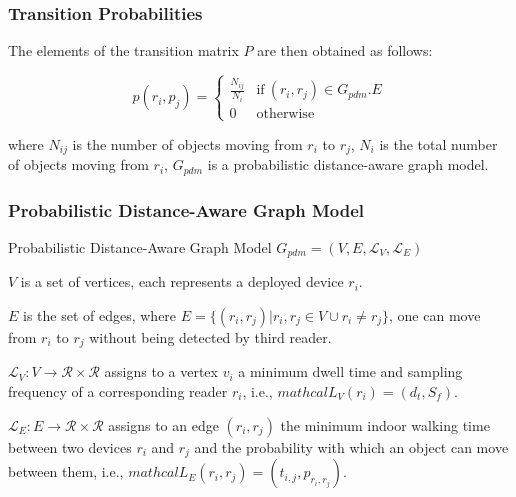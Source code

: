 
\begin{frame}
\frametitle{Transition Probabilities}

The elements of the transition matrix $P$ are then obtained as follows:

\vspace{10pt}

\begin{equation}
  p(r_i, p_j) = \left\{\begin{matrix}
\frac{N_{ij}}{N_i} & \text{if}~(r_i, r_j) \in G_{pdm}.E\\
0 & \text{otherwise}
\end{matrix}\right.
\end{equation}

\vspace{10pt}

where $N_{ij}$ is the number of objects moving from $r_i$ to $r_j$, $N_i$ is the total number of objects moving from $r_i$, $G_{pdm}$ is a probabilistic distance-aware graph model.

\end{frame}


\begin{frame}
\frametitle{Probabilistic Distance-Aware Graph Model}

\begin{block}{Probabilistic Distance-Aware Graph Model}
  $G_{pdm} = (V, E, \mathcal{L}_V, \mathcal{L}_E)$
  \begin{fitemize}
    \item $V$ is a set of vertices, each represents a deployed device $r_i$.
    \item $E$ is the set of edges, where $E = \{ (r_i, r_j) | r_i, r _j \in V \cup r_i \neq r_j \}$, one can move from $r_i$ to $r_j$ without being detected by third reader.
    \item $\mathcal{L}_V: V \rightarrow \mathcal{R} \times \mathcal{R}$ assigns to a vertex $v_i$ a minimum dwell time and sampling frequency of a corresponding reader $r_i$, i.e., $mathcal{L}_V(r_i) = (d_t, S_f)$.
    \item $\mathcal{L}_E: E \rightarrow \mathcal{R} \times \mathcal{R}$ assigns to an edge $(r_i, r_j)$ the minimum indoor walking time between two devices $r_i$ and $r_j$ and the probability with which an object can move between them, i.e., $mathcal{L}_E(r_i, r_j) = (t_{i,j}, p_{r_i,r_j})$.
  \end{fitemize}
\end{block}

\end{frame}

